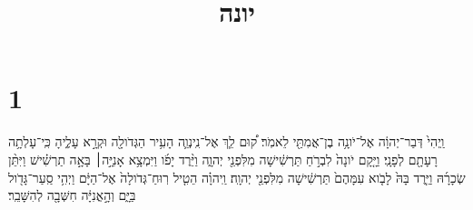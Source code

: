 \documentclass{openreader}
\title{יונה}
\date{}
\begin{document}
\maketitle
\raggedbottom 
\fontsize{16pt}{24pt}\selectfont
\section*{1}
וַֽיְהִי֙ דְּבַר־יְהוָ֔ה אֶל־יֹונָ֥ה בֶן־אֲמִתַּ֖י לֵאמֹֽר׃ ק֠וּם לֵ֧ךְ אֶל־נִֽינְוֵ֛ה הָעִ֥יר הַגְּדֹולָ֖ה וּקְרָ֣א עָלֶ֑יהָ כִּֽי־עָלְתָ֥ה רָעָתָ֖ם לְפָנָֽי׃ וַיָּ֤קָם יֹונָה֙ לִבְרֹ֣חַ תַּרְשִׁ֔ישָׁה מִלִּפְנֵ֖י יְהוָ֑ה וַיֵּ֨רֶד יָפֹ֜ו וַיִּמְצָ֥א אָנִיָּ֣ה׀ בָּאָ֣ה תַרְשִׁ֗ישׁ וַיִּתֵּ֨ן שְׂכָרָ֜הּ וַיֵּ֤רֶד בָּהּ֙ לָבֹ֤וא עִמָּהֶם֙ תַּרְשִׁ֔ישָׁה מִלִּפְנֵ֖י יְהוָֽה׃ וַֽיהוָ֗ה הֵטִ֤יל רֽוּחַ־גְּדֹולָה֙ אֶל־הַיָּ֔ם וַיְהִ֥י סַֽעַר־גָּדֹ֖ול בַּיָּ֑ם וְהָ֣אֳנִיָּ֔ה חִשְּׁבָ֖ה לְהִשָּׁבֵֽר׃ 
\end{document}

